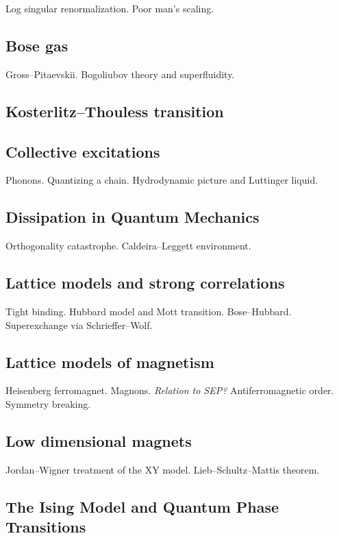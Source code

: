 Log singular renormalization. Poor man's scaling.

\subsection{Bose gas}

Gross--Pitaevskii. Bogoliubov theory and superfluidity.

\subsection{Kosterlitz--Thouless transition}

\subsection{Collective excitations}

Phonons. Quantizing a chain. Hydrodynamic picture and Luttinger liquid.

\subsection{Dissipation in Quantum Mechanics}

Orthogonality catastrophe. Caldeira--Leggett environment.

\subsection{Lattice models and strong correlations}

Tight binding. Hubbard model and Mott transition. Bose--Hubbard. Superexchange via Schrieffer--Wolf.

\subsection{Lattice models of magnetism}

Heisenberg ferromagnet. Magnons. \textit{Relation to SEP?}
Antiferromagnetic order. Symmetry breaking.

\subsection{Low dimensional magnets}

Jordan--Wigner treatment of the XY model. Lieb--Schultz--Mattis theorem.

\subsection{The Ising Model and Quantum Phase Transitions}

